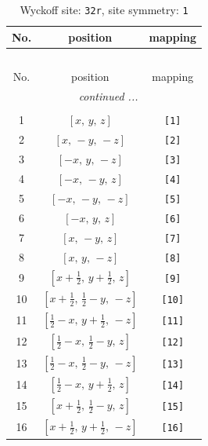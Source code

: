 \documentclass[fleqn,8pt]{jsarticle}
\begin{document}
\renewcommand{\arraystretch}{1.2}
\begin{longtable}{ccc}
\caption{Wyckoff site: {\tt 32r}, site symmetry: {\tt 1}}
 \\
 \hline \hline
No. & position & mapping \\ \hline \endfirsthead

\multicolumn{2}{l}{\tablename\ \thetable{}} \\
 \hline \hline
No. & position & mapping \\ \hline \endhead

 \hline \hline
\multicolumn{2}{r}{\footnotesize\it continued ...} \\ \endfoot

 \hline \hline
\multicolumn{2}{r}{} \\ \endlastfoot

1 & $\left[ x,\, y,\, z \right]$ & {\tt [1]} \\ \hline
2 & $\left[ x,\, - y,\, - z \right]$ & {\tt [2]} \\ \hline
3 & $\left[ - x,\, y,\, - z \right]$ & {\tt [3]} \\ \hline
4 & $\left[ - x,\, - y,\, z \right]$ & {\tt [4]} \\ \hline
5 & $\left[ - x,\, - y,\, - z \right]$ & {\tt [5]} \\ \hline
6 & $\left[ - x,\, y,\, z \right]$ & {\tt [6]} \\ \hline
7 & $\left[ x,\, - y,\, z \right]$ & {\tt [7]} \\ \hline
8 & $\left[ x,\, y,\, - z \right]$ & {\tt [8]} \\ \hline
9 & $\left[ x + \frac{1}{2},\, y + \frac{1}{2},\, z \right]$ & {\tt [9]} \\ \hline
10 & $\left[ x + \frac{1}{2},\, \frac{1}{2} - y,\, - z \right]$ & {\tt [10]} \\ \hline
11 & $\left[ \frac{1}{2} - x,\, y + \frac{1}{2},\, - z \right]$ & {\tt [11]} \\ \hline
12 & $\left[ \frac{1}{2} - x,\, \frac{1}{2} - y,\, z \right]$ & {\tt [12]} \\ \hline
13 & $\left[ \frac{1}{2} - x,\, \frac{1}{2} - y,\, - z \right]$ & {\tt [13]} \\ \hline
14 & $\left[ \frac{1}{2} - x,\, y + \frac{1}{2},\, z \right]$ & {\tt [14]} \\ \hline
15 & $\left[ x + \frac{1}{2},\, \frac{1}{2} - y,\, z \right]$ & {\tt [15]} \\ \hline
16 & $\left[ x + \frac{1}{2},\, y + \frac{1}{2},\, - z \right]$ & {\tt [16]} \\ \hline

\end{longtable}
\end{document}
